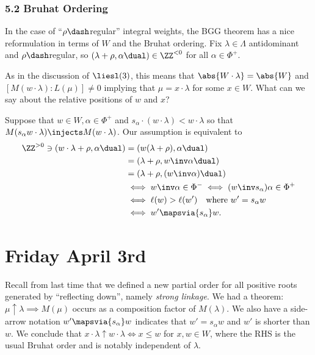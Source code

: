 \hypertarget{bruhat-ordering}{%
\subsubsection{5.2 Bruhat Ordering}\label{bruhat-ordering}}

In the case of ``\(\rho\dash\)regular'' integral weights, the BGG
theorem has a nice reformulation in terms of \(W\) and the Bruhat
ordering. Fix \(\lambda \in \Lambda\) antidominant and
\(\rho\dash\)regular, so \((\lambda + \rho, \alpha\dual) \in \ZZ^{< 0}\)
for all \(\alpha\in \Phi^+\).

As in the discussion of \(\liesl(3)\), this means that
\(\abs{W\cdot \lambda} = \abs{W}\) and
\([M(w\cdot \lambda) : L(\mu)] \neq 0\) implying that
\(\mu = x\cdot \lambda\) for some \(x\in W\). What can we say about the
relative positions of \(w\) and \(x\)?

Suppose that \(w\in W, \alpha\in\Phi^+\) and
\(s_\alpha \cdot (w\cdot \lambda) < w\cdot \lambda\) so that
\(M(s_\alpha w \cdot \lambda) \injects M(w\cdot \lambda)\). Our
assumption is equivalent to \begin{align*}
\ZZ^{>0} \ni (w\cdot \lambda + \rho, \alpha\dual) 
&= (w(\lambda+\rho), \alpha\dual)\\
&= (\lambda + \rho, w\inv \alpha\dual) \\
&= (\lambda + \rho, (w\inv\alpha)\dual) \\
&\iff w\inv \alpha \in \Phi^- \iff (w\inv s_\alpha) \alpha \in \Phi^+ \\
&\iff \ell(w) > \ell(w') \quad \text{where } w' = s_\alpha w \\
&\iff w' \mapsvia{s_\alpha} w
.\end{align*}

\hypertarget{friday-april-3rd}{%
\section{Friday April 3rd}\label{friday-april-3rd}}

Recall from last time that we defined a new partial order for all
positive roots generated by ``reflecting down'', namely \emph{strong
linkage}. We had a theorem: \(\mu \uparrow \lambda \implies M(\mu)\)
occurs as a composition factor of \(M(\lambda)\). We also have a
side-arrow notation \(w' \mapsvia{s_\alpha} w\) indicates that
\(w' = s_\alpha w\) and \(w'\) is shorter than \(w\). We conclude that
\(x\cdot \lambda \uparrow w\cdot \lambda \iff x\leq w\) for
\(x, w\in W\), where the RHS is the usual Bruhat order and is notably
independent of \(\lambda\).


